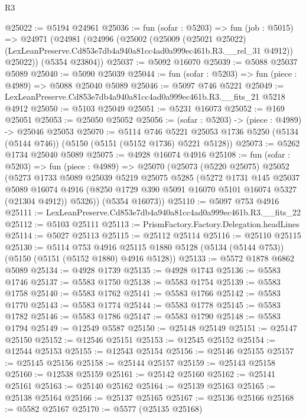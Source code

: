 \begin{lexlean}{R3}
\begin{coremodule}
@25022 := @5194 @24961
@25036 := fun (sofar : @5203) =>
  fun (job : @5015) =>
  @24971
    (@24981
      (@24996
        (@25002
          (@25009
            (@25021 @25022)
            (LexLeanPreserve.Cd853e7db4a940a81cc4ad0a999ec461b.R3.__rel_31 @4912))
          @25022))
      (@5354 @23804))
@25037 := @5092 @16070
@25039 := @5088 @25037 @5089
@25040 := @5090 @25039
@25044 := fun (sofar : @5203) => fun (piece : @4989) => @5088 @25040 @5089
@25046 := @5097 @746 @5221
@25049 := LexLeanPreserve.Cd853e7db4a940a81cc4ad0a999ec461b.R3.__fits_21 @5218 @4912
@25050 := @5103 @25049
@25051 := @5231 @16073
@25052 := @169 @25051
@25053 := @25050 @25052
@25056 := (sofar : @5203) -> (piece : @4989) -> @25046 @25053
@25070 := @5114
    @746
    @5221
    @25053
    @1736
    @5250
    (@5134 (@5144 @746))
    (@5150 (@5151 (@5152 @1736) @5221 @5128))
@25073 := @5262 @1734 @25040 @5089
@25075 := @4928 @16074 @4916
@25108 := fun (sofar : @5203) =>
  fun (piece : @4989) =>
  @25070
    (@25073
      (@5220 @25075)
      @25052
      (@5273
        @1733
        @5089
        @25039
        @5219
        @25075
        @5285
        (@5272
          @1731
          @145
          @25037
          @5089
          @16074
          @4916
          (@8250 @1729 @390 @5091 @16070 @5101 @16074 @5327 (@21304 @4912))
          @5326))
      (@5354 @16073))
@25110 := @5097 @753 @4916
@25111 := LexLeanPreserve.Cd853e7db4a940a81cc4ad0a999ec461b.R3.__fits_22
@25112 := @5103 @25111
@25113 := PrismFactory.Factory.Delegation.headLines
@25114 := @5027 @25113
@25115 := @25112 @25114
@25116 := @25110 @25115
@25130 := @5114
    @753
    @4916
    @25115
    @1880
    @5128
    (@5134 (@5144 @753))
    (@5150 (@5151 (@5152 @1880) @4916 @5128))
@25133 := @5572 @1878 @6862 @5089
@25134 := @4928 @1739
@25135 := @4928 @1743
@25136 := @5583 @1746
@25137 := @5583 @1750
@25138 := @5583 @1754
@25139 := @5583 @1758
@25140 := @5583 @1762
@25141 := @5583 @1766
@25142 := @5583 @1770
@25143 := @5583 @1774
@25144 := @5583 @1778
@25145 := @5583 @1782
@25146 := @5583 @1786
@25147 := @5583 @1790
@25148 := @5583 @1794
@25149 := @12549 @5587
@25150 := @25148 @25149
@25151 := @25147 @25150
@25152 := @12546 @25151
@25153 := @12545 @25152
@25154 := @12544 @25153
@25155 := @12543 @25154
@25156 := @25146 @25155
@25157 := @25145 @25156
@25158 := @25144 @25157
@25159 := @25143 @25158
@25160 := @12538 @25159
@25161 := @25142 @25160
@25162 := @25141 @25161
@25163 := @25140 @25162
@25164 := @25139 @25163
@25165 := @25138 @25164
@25166 := @25137 @25165
@25167 := @25136 @25166
@25168 := @5582 @25167
@25170 := @5577 (@25135 @25168)

\end{coremodule}
\end{lexlean}
